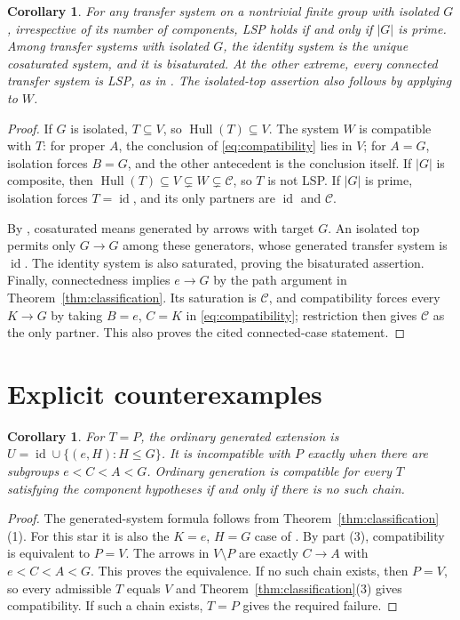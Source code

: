 \documentclass[11pt]{article}
\newtheorem{corollary}[theorem]{Corollary}
\newcommand{\Hull}{\operatorname{Hull}}
\newcommand{\id}{\operatorname{id}}
\begin{document}
\begin{corollary}\label{cor:extremes}
For any transfer system on a nontrivial finite group with isolated $G$,
irrespective of its number of components, LSP holds if and only if $|G|$
is prime. Among transfer systems with isolated $G$, the identity system
is the unique cosaturated system, and it is bisaturated.
At the other extreme, every connected transfer system is LSP, as in
\cite[Corollary 2.15 and Theorem 3.11]{M}.
The isolated-top assertion also follows by applying
\cite[Proposition 3.17]{D} to $W$.
\end{corollary}
\begin{proof}
If $G$ is isolated, $T\subseteq V$, so $\Hull(T)\subseteq V$.
The system $W$ is compatible with $T$: for proper $A$, the conclusion
of \eqref{eq:compatibility} lies in $V$; for $A=G$, isolation forces
$B=G$, and the other antecedent is the conclusion itself.
If $|G|$ is composite, then
$\Hull(T)\subseteq V\subsetneq W\subsetneq\mathcal C$,
so $T$ is not LSP. If $|G|$ is prime, isolation forces $T=\id$,
and its only partners are $\id$ and $\mathcal C$.

By \cite[Definition 2.18]{K}, cosaturated means generated by arrows
with target $G$. An isolated top permits only $G\to G$ among these
generators, whose generated transfer system is $\id$.
The identity system is also saturated, proving the bisaturated assertion.
Finally, connectedness implies $e\to G$ by the path argument in
Theorem~\ref{thm:classification}. Its saturation is $\mathcal C$, and
compatibility forces every $K\to G$ by taking $B=e$, $C=K$ in
\eqref{eq:compatibility}; restriction then gives $\mathcal C$ as the
only partner. This also proves the cited connected-case statement.
\end{proof}

\section{Explicit counterexamples}
\begin{corollary}\label{cor:star}
For $T=P$, the ordinary generated extension is
$U=\id\cup\{(e,H):H\leq G\}$.
It is incompatible with $P$ exactly when there are subgroups
$e<C<A<G$.
Ordinary generation is compatible for every $T$ satisfying the component
hypotheses if and only if there is no such chain.
\end{corollary}
\begin{proof}
The generated-system formula follows from Theorem~\ref{thm:classification}(1).
For this star it is also the $K=e$, $H=G$ case of
\cite[Proposition A.6]{R}.
By part (3), compatibility is equivalent to $P=V$.
The arrows in $V\setminus P$ are exactly $C\to A$ with
$e<C<A<G$. This proves the equivalence.
If no such chain exists, then $P=V$, so every admissible $T$ equals $V$
and Theorem~\ref{thm:classification}(3) gives compatibility.
If such a chain exists, $T=P$ gives the required failure.
\end{proof}
\end{document}
